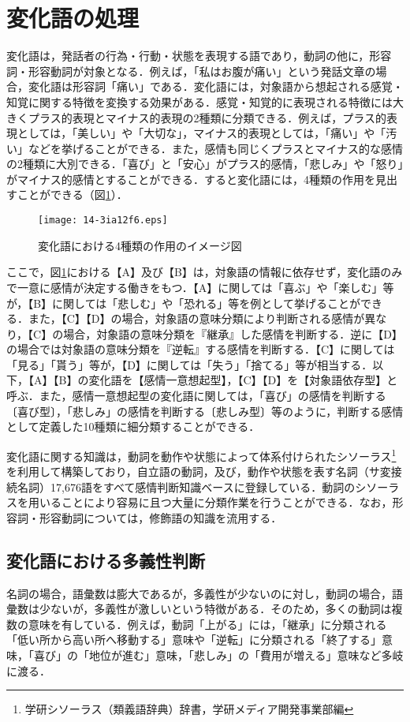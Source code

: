 \documentclass[japanese]{jnlp_1.3a}
\begin{document}
\section{変化語の処理}\label{hennkago}
変化語は，発話者の行為・行動・状態を表現する語であり，動詞の他に，形容詞・形容動詞が対象となる．例えば，「私はお腹が痛い」という発話文章の場合，変化語は形容詞「痛い」である．変化語には，対象語から想起される感覚・知覚に関する特徴を変換する効果がある．感覚・知覚的に表現される特徴には大きくプラス的表現とマイナス的表現の2種類に分類できる．例えば，プラス的表現としては，「美しい」や「大切な」，マイナス的表現としては，「痛い」や「汚い」などを挙げることができる．また，感情も同じくプラスとマイナス的な感情の2種類に大別できる．「喜び」と「安心」がプラス的感情，「悲しみ」や「怒り」がマイナス的感情とすることができる．すると変化語には，4種類の作用を見出すことができる（図\ref{sayou_of_hennkago}）．

\begin{figure}[b]
\begin{center}
    \texttt{[image: 14-3ia12f6.eps]}
\end{center}
\caption{変化語における4種類の作用のイメージ図}
\label{sayou_of_hennkago}
\end{figure}

ここで，図\ref{sayou_of_hennkago}における【A】及び【B】は，対象語の情報に依存せず，変化語のみで一意に感情が決定する働きをもつ．【A】に関しては「喜ぶ」や「楽しむ」等が，【B】に関しては「悲しむ」や「恐れる」等を例として挙げることができる．また，【C】【D】の場合，対象語の意味分類により判断される感情が異なり，【C】の場合，対象語の意味分類を『継承』した感情を判断する．逆に【D】の場合では対象語の意味分類を『逆転』する感情を判断する．【C】に関しては「見る」「貰う」等が，【D】に関しては「失う」「捨てる」等が相当する．以下，【A】【B】の変化語を【感情一意想起型】，【C】【D】を【対象語依存型】と呼ぶ．また，感情一意想起型の変化語に関しては，「喜び」の感情を判断する〔喜び型〕，「悲しみ」の感情を判断する〔悲しみ型〕等のように，判断する感情として定義した10種類に細分類することができる．

変化語に関する知識は，動詞を動作や状態によって体系付けられたシソーラス\footnote{学研シソーラス（類義語辞典）辞書，学研メディア開発事業部編}を利用して構築しており，自立語の動詞，及び，動作や状態を表す名詞（サ変接続名詞）17,676語をすべて感情判断知識ベースに登録している．動詞のシソーラスを用いることにより容易に且つ大量に分類作業を行うことができる．なお，形容詞・形容動詞については，修飾語の知識を流用する．


\subsection{変化語における多義性判断}
名詞の場合，語彙数は膨大であるが，多義性が少ないのに対し，動詞の場合，語彙数は少ないが，多義性が激しいという特徴がある．そのため，多くの動詞は複数の意味を有している．例えば，動詞「上がる」には，「継承」に分類される「低い所から高い所へ移動する」意味や「逆転」に分類される「終了する」意味，「喜び」の「地位が進む」意味，「悲しみ」の「費用が増える」意味など多岐に渡る．
\end{document}
